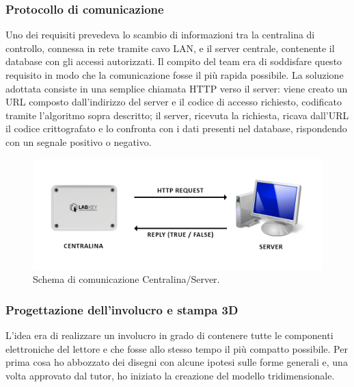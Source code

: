 \subsubsection{Protocollo di comunicazione}
Uno dei requisiti prevedeva lo scambio di informazioni tra la centralina di controllo, connessa in rete tramite cavo LAN, e il server centrale, contenente il database con gli accessi autorizzati.
Il compito del team era di soddisfare questo requisito in modo che la comunicazione fosse il più rapida possibile.
La soluzione adottata consiste in una semplice chiamata HTTP verso il server: viene creato un URL composto dall'indirizzo del server e il codice di accesso richiesto, codificato tramite l'algoritmo sopra descritto; il server, ricevuta la richiesta, ricava dall'URL il codice crittografato e lo confronta con i dati presenti nel database, rispondendo con un segnale positivo o negativo.

\begin{figure}[H]
	\begin{center}
	\includegraphics[scale=0.37]{immagini/comunicazione_http.png}
	\caption{Schema di comunicazione Centralina/Server.}
	\end{center}
\end{figure}

\subsubsection{Progettazione dell'involucro e stampa 3D}
L'idea era di realizzare un involucro in grado di contenere tutte le componenti elettroniche del lettore e che fosse allo stesso tempo il più compatto possibile.
Per prima cosa ho abbozzato dei disegni con alcune ipotesi sulle forme generali e, una volta approvato dal tutor, ho iniziato la creazione del modello tridimensionale.

